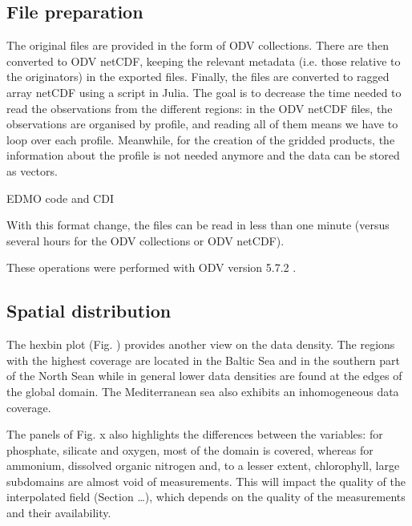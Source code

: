 \documentclass[essd, manuscript]{copernicus}
\begin{document}
\subsection{File preparation}

The original files are provided in the form of ODV \citep[Ocean Data View,][]{Schlitzer2002} collections. There are then converted to ODV netCDF, keeping the relevant metadata (i.e. those relative to the originators) in the exported files. Finally, the files are converted to ragged array netCDF using a script in Julia. The goal is to decrease the time needed to read the observations from the different regions: in the ODV netCDF files, the observations are organised by profile, and reading all of them means we have to loop over each profile. Meanwhile, for the creation of the gridded products, the information about the profile is not needed anymore and the data can be stored as vectors.

EDMO code and CDI \citep{Schaap2010}

With this format change, the files can be read in less than one minute (versus several hours for the ODV collections or ODV netCDF).

These operations were performed with ODV version 5.7.2 \citep{SCHLITZER2024}.
 

\subsection{Spatial distribution}

The hexbin plot (Fig. ) provides another view on the data density. The regions with the highest coverage are located in the Baltic Sea and in the southern part of the North Sean while in general lower data densities are found at the edges of the global domain. The Mediterranean sea also exhibits an inhomogeneous data coverage. 

The panels of Fig. x also highlights the differences between the variables: for phosphate, silicate and oxygen, most of the domain is covered, whereas for ammonium, dissolved organic nitrogen and, to a lesser extent, chlorophyll, large subdomains are almost void of measurements. This will impact the quality of the interpolated field (Section …), which depends on the quality of the measurements and their availability.
\end{document}
